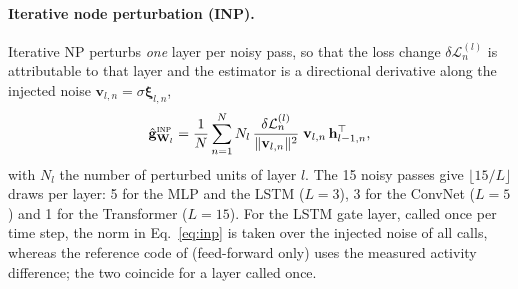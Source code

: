 \documentclass{article}
\newcommand{\method}[1]{\textsc{#1}}
\newcommand{\INP}{\method{inp}}
\newcommand{\ghat}{\hat{\mathbf{g}}}
\newcommand{\bxi}{\boldsymbol{\xi}}
\newcommand{\bv}{\mathbf{v}}
\newcommand{\bh}{\mathbf{h}}
\newcommand{\bW}{\mathbf{W}}
\newcommand{\dL}{\delta\mathcal{L}}
\begin{document}
\paragraph{Iterative node perturbation (INP).}
Iterative NP \citep{dalm2023} perturbs \emph{one} layer per noisy pass, so that the
loss change $\dL^{(l)}_n$ is attributable to that layer and the estimator is a
directional derivative along the injected noise $\bv_{l,n}=\sigma\bxi_{l,n}$,
\begin{equation}
  \ghat_{\bW_l}^{\INP}=\frac{1}{N}\sum_{n=1}^{N}
    N_l\,\frac{\dL^{(l)}_n}{\|\bv_{l,n}\|^{2}}\;\bv_{l,n}\,\bh_{l-1,n}^{\top},
  \label{eq:inp}
\end{equation}
with $N_l$ the number of perturbed units of layer $l$. The 15 noisy passes give
$\lfloor 15/L\rfloor$ draws per layer: 5 for the MLP and the LSTM ($L=3$), 3 for the
ConvNet ($L=5$) and 1 for the Transformer ($L=15$). For the LSTM gate layer, called
once per time step, the norm in Eq.~\eqref{eq:inp} is taken over the injected noise of
all calls, whereas the reference code of \citet{dalm2023} (feed-forward only) uses the
measured activity difference; the two coincide for a layer called once.
\end{document}
